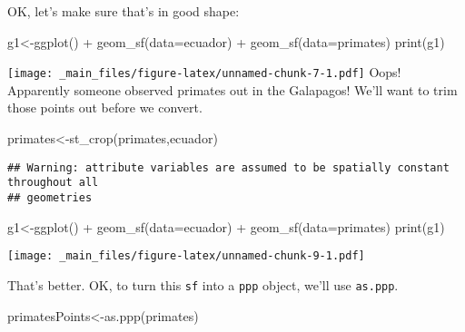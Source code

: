 \documentclass[
]{book}
\newenvironment{Shaded}{\begin{snugshade}}{\end{snugshade}}
\newcommand{\AttributeTok}[1]{\textcolor[rgb]{0.77,0.63,0.00}{#1}}
\newcommand{\FunctionTok}[1]{\textcolor[rgb]{0.00,0.00,0.00}{#1}}
\newcommand{\NormalTok}[1]{#1}
\newcommand{\OtherTok}[1]{\textcolor[rgb]{0.56,0.35,0.01}{#1}}
\newcommand{\SpecialCharTok}[1]{\textcolor[rgb]{0.00,0.00,0.00}{#1}}
\begin{document}
OK, let's make sure that's in good shape:

\begin{Shaded}
\begin{Highlighting}[]
\NormalTok{g1}\OtherTok{\textless{}{-}}\FunctionTok{ggplot}\NormalTok{() }\SpecialCharTok{+}
  \FunctionTok{geom\_sf}\NormalTok{(}\AttributeTok{data=}\NormalTok{ecuador) }\SpecialCharTok{+}
  \FunctionTok{geom\_sf}\NormalTok{(}\AttributeTok{data=}\NormalTok{primates)}
\FunctionTok{print}\NormalTok{(g1)}
\end{Highlighting}
\end{Shaded}

\texttt{[image: \_main\_files/figure-latex/unnamed-chunk-7-1.pdf]}
Oops! Apparently someone observed primates out in the Galapagos! We'll want to trim those points out before we convert.

\begin{Shaded}
\begin{Highlighting}[]
\NormalTok{primates}\OtherTok{\textless{}{-}}\FunctionTok{st\_crop}\NormalTok{(primates,ecuador)}
\end{Highlighting}
\end{Shaded}

\begin{verbatim}
## Warning: attribute variables are assumed to be spatially constant throughout all
## geometries
\end{verbatim}

\begin{Shaded}
\begin{Highlighting}[]
\NormalTok{g1}\OtherTok{\textless{}{-}}\FunctionTok{ggplot}\NormalTok{() }\SpecialCharTok{+}
  \FunctionTok{geom\_sf}\NormalTok{(}\AttributeTok{data=}\NormalTok{ecuador) }\SpecialCharTok{+}
  \FunctionTok{geom\_sf}\NormalTok{(}\AttributeTok{data=}\NormalTok{primates)}
\FunctionTok{print}\NormalTok{(g1)}
\end{Highlighting}
\end{Shaded}

\texttt{[image: \_main\_files/figure-latex/unnamed-chunk-9-1.pdf]}

That's better. OK, to turn this \texttt{sf} into a \texttt{ppp} object, we'll use \texttt{as.ppp}.

\begin{Shaded}
\begin{Highlighting}[]
\NormalTok{primatesPoints}\OtherTok{\textless{}{-}}\FunctionTok{as.ppp}\NormalTok{(primates)}
\end{Highlighting}
\end{Shaded}
\end{document}
